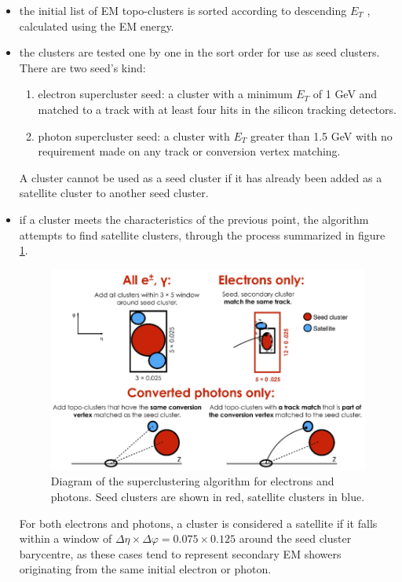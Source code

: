 \documentclass[a4paper, oneside]{book}
\begin{document}
		\begin{itemize}
		\item the initial list of EM topo-clusters is
		sorted according to descending $E_T$ , calculated using the EM energy.
		\item the clusters are tested one by one in the sort order for use as seed clusters. There are two seed's kind:
			\begin{enumerate}[label=\roman*.]
				\item electron supercluster seed: a cluster with a minimum $E_T$ of 1 GeV and matched to a track with at least four hits in the silicon tracking detectors.
				\item photon supercluster seed: a cluster with $E_T$ greater
				than 1.5 GeV with no requirement made on any track or conversion
				vertex matching.
			\end{enumerate}
		A cluster cannot be used as a seed cluster if it has already been added as a satellite cluster to another seed cluster.
		\item if a cluster meets the characteristics of the previous point, the algorithm attempts to find satellite clusters, through the process summarized in figure \ref{fig:super_cl}.
		\begin{figure}
			\centering
			\includegraphics[width=0.45\textheight]{tesi_images/super_cluster.png}
			\caption{Diagram of the superclustering algorithm for electrons and photons. Seed clusters are shown in
			red, satellite clusters in blue.}
			\label{fig:super_cl}
		\end{figure}
		For both electrons and photons, a cluster is considered a satellite if it falls within a window of $\Delta\eta \times \Delta\varphi = 0.075 \times 0.125$ around the seed cluster barycentre, as these cases tend to represent secondary EM showers originating from the same initial electron or photon.

\end{itemize}
\end{document}
